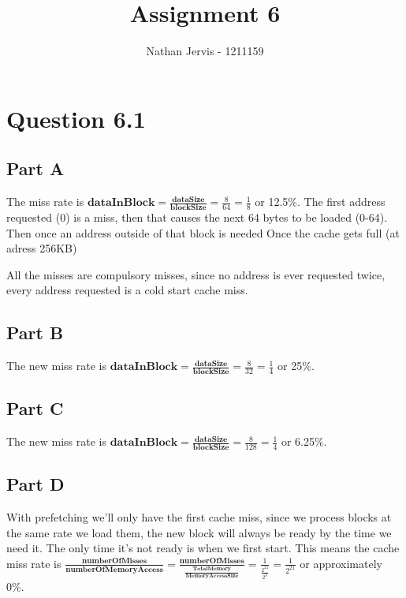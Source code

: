 \documentclass[11pt]{article} %
\title{Assignment 6}
\author{Nathan Jervis - 1211159}
\begin{document}
\maketitle

\section{Question 6.1}

\subsection{Part A}

The miss rate is $\textbf{dataInBlock} = \frac{\textbf{dataSize}}{\textbf{blockSize}} = \frac{8}{64} = \frac{1}{8}$ or 12.5\%. The first address requested (0) is a miss, then that causes the next 64 bytes to be loaded (0-64). Then once an address outside of that block is needed Once the cache gets full (at adress 256KB)

All the misses are compulsory misses, since no address is ever requested twice, every address requested is a cold start cache miss.

\subsection{Part B}

The new miss rate is $\textbf{dataInBlock} = \frac{\textbf{dataSize}}{\textbf{blockSize}} = \frac{8}{32} = \frac{1}{4}$ or 25\%.

\subsection{Part C}

The new miss rate is $\textbf{dataInBlock} = \frac{\textbf{dataSize}}{\textbf{blockSize}} = \frac{8}{128} = \frac{1}{4}$ or 6.25\%.

\subsection{Part D}

With prefetching we'll only have the first cache miss, since we process blocks at the same rate we load them, the new block will always be ready by the time we need it. The only time it's not ready is when we first start. This means the cache miss rate is $\frac{\textbf{numberOfMisses}}{\textbf{numberOfMemoryAccess}} = \frac{\textbf{numberOfMisses}}{\frac{\textbf{TotalMemory}}{\textbf{MemoryAccessSize}}} = \frac{1}{\frac{2^{24}}{2^{3}}} = \frac{1}{2^{21}}$ or approximately 0\%.
\end{document}
